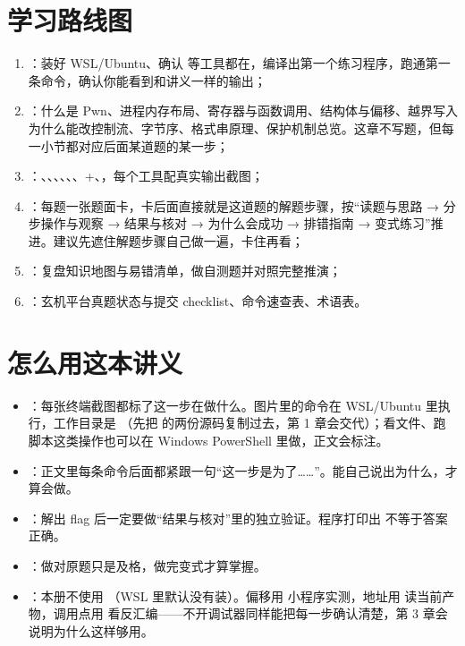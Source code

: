 \documentclass[UTF8,12pt,oneside]{ctexbook}
\begin{document}
\section*{学习路线图}
\begin{enumerate}
\item {}：装好 WSL/Ubuntu、确认  等工具都在，编译出第一个练习程序，跑通第一条命令，确认你能看到和讲义一样的输出；
\item {}：什么是 Pwn、进程内存布局、寄存器与函数调用、结构体与偏移、越界写入为什么能改控制流、字节序、格式串原理、保护机制总览。这章不写题，但每一小节都对应后面某道题的某一步；
\item {}：、、、、、、+、，每个工具配真实输出截图；
\item {}：每题一张题面卡，卡后面直接就是这道题的解题步骤，按“读题与思路 → 分步操作与观察 → 结果与核对 → 为什么会成功 → 排错指南 → 变式练习”推进。建议先遮住解题步骤自己做一遍，卡住再看；
\item {}：复盘知识地图与易错清单，做自测题并对照完整推演；
\item {}：玄机平台真题状态与提交 checklist、命令速查表、术语表。
\end{enumerate}

\section*{怎么用这本讲义}
\begin{itemize}
\item {}：每张终端截图都标了这一步在做什么。图片里的命令在 WSL/Ubuntu 里执行，工作目录是 （先把  的两份源码复制过去，第 1 章会交代）；看文件、跑脚本这类操作也可以在 Windows PowerShell 里做，正文会标注。
\item {}：正文里每条命令后面都紧跟一句“这一步是为了……”。能自己说出为什么，才算会做。
\item {}：解出 flag 后一定要做“结果与核对”里的独立验证。程序打印出  不等于答案正确。
\item {}：做对原题只是及格，做完变式才算掌握。
\item {}：本册不使用 （WSL 里默认没有装）。偏移用  小程序实测，地址用  读当前产物，调用点用  看反汇编——不开调试器同样能把每一步确认清楚，第 3 章会说明为什么这样够用。
\end{itemize}
\end{document}
